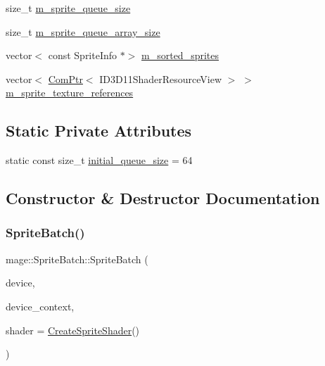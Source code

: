 \begin{DoxyCompactItemize}
\item 
size\+\_\+t \hyperlink{classmage_1_1_sprite_batch_a0d7dadf01e3b905072c1aaa6b8e42c0e}{m\+\_\+sprite\+\_\+queue\+\_\+size}
\item 
size\+\_\+t \hyperlink{classmage_1_1_sprite_batch_a207760f2e11b1ea199529c65c9b21b3b}{m\+\_\+sprite\+\_\+queue\+\_\+array\+\_\+size}
\item 
vector$<$ const Sprite\+Info $\ast$$>$ \hyperlink{classmage_1_1_sprite_batch_a65ad09d31c928ab1522d8b2c0c509b9a}{m\+\_\+sorted\+\_\+sprites}
\item 
vector$<$ \hyperlink{namespacemage_ae74f374780900893caa5555d1031fd79}{Com\+Ptr}$<$ I\+D3\+D11\+Shader\+Resource\+View $>$ $>$ \hyperlink{classmage_1_1_sprite_batch_ad8a5bb3b418c2cad84fecac0979a600c}{m\+\_\+sprite\+\_\+texture\+\_\+references}
\end{DoxyCompactItemize}
\subsection*{Static Private Attributes}
\begin{DoxyCompactItemize}
\item 
static const size\+\_\+t \hyperlink{classmage_1_1_sprite_batch_a4d299bc556a82050b2e185d3c421247c}{initial\+\_\+queue\+\_\+size} = 64
\end{DoxyCompactItemize}


\subsection{Constructor \& Destructor Documentation}
\hypertarget{classmage_1_1_sprite_batch_a2269b99bd1027ee80900573a2ee51242}{}\label{classmage_1_1_sprite_batch_a2269b99bd1027ee80900573a2ee51242} 
\subsubsection{\texorpdfstring{Sprite\+Batch()}{SpriteBatch()}\hspace{0.1cm}{\footnotesize\ttfamily [1/3]}}
{\footnotesize\ttfamily mage\+::\+Sprite\+Batch\+::\+Sprite\+Batch (\begin{DoxyParamCaption}\item[{I\+D3\+D11\+Device2 $\ast$}]{device,  }\item[{I\+D3\+D11\+Device\+Context2 $\ast$}]{device\+\_\+context,  }\item[{const \hyperlink{structmage_1_1_combined_shader}{Combined\+Shader} \&}]{shader = {\ttfamily \hyperlink{namespacemage_af6f5c6ae46131caa77e5361d23d5d7c8}{Create\+Sprite\+Shader}()} }\end{DoxyParamCaption})}

